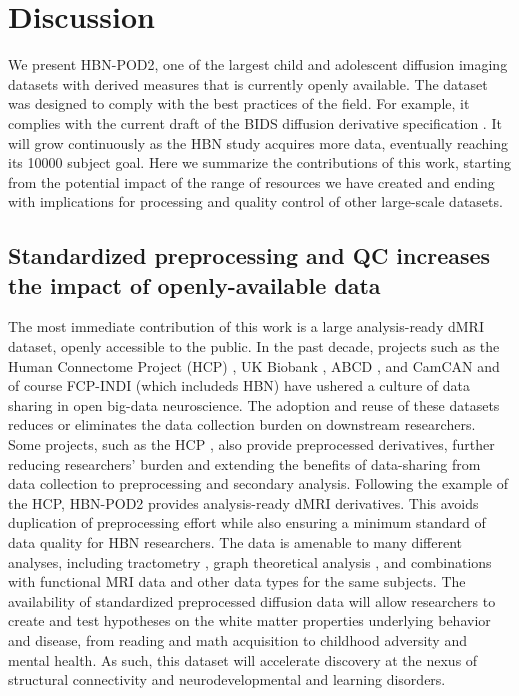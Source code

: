 \documentclass[fleqn,10pt]{wlscirep}
\begin{document}
\section*{Discussion}

We present HBN-POD2, one of the largest child and adolescent diffusion imaging
datasets with derived measures that is currently openly available. The dataset
was designed to comply with the best practices of the field. For example, it
complies with the current draft of the BIDS diffusion derivative specification
\cite{Pestilli2021}. It will grow continuously as the HBN study acquires more
data, eventually reaching its \num{10000} subject goal. Here we summarize the
contributions of this work, starting from the potential impact of the range of
resources we have created and ending with implications for processing and
quality control of other large-scale datasets.

\subsection*{Standardized preprocessing and QC increases the impact of openly-available data}

The most immediate contribution of this work is a large analysis-ready dMRI
dataset, openly accessible to the public. In the past decade, projects such as
the Human Connectome Project (HCP) \cite{van-essen2013-oi}, UK Biobank
\cite{miller2016-mq}, ABCD \cite{jernigan2018-my}, and CamCAN
\cite{taylor2017-or,shafto2014-ld} and of course FCP-INDI (which includeds HBN)
\cite{Mennes2013-eu} have ushered a culture of data sharing in open big-data
neuroscience. The adoption and reuse of these datasets reduces or eliminates the
data collection burden on downstream researchers. Some projects, such as the HCP
\cite{glasser2013-lo}, also provide preprocessed derivatives, further reducing
researchers' burden and extending the benefits of data-sharing from data
collection to preprocessing and secondary analysis. Following the example of the
HCP, HBN-POD2 provides analysis-ready dMRI derivatives. This avoids duplication
of preprocessing effort while also ensuring a minimum standard of data quality
for HBN researchers. The data is amenable to many different analyses, including
tractometry \cite{yeatman2012-rc}, graph theoretical analysis \cite{yeh2020-nu},
and combinations with functional MRI data and other data types for the same
subjects. The availability of standardized preprocessed diffusion data will
allow researchers to create and test hypotheses on the white matter properties
underlying behavior and disease, from reading and math acquisition to childhood
adversity and mental health. As such, this dataset will accelerate discovery at
the nexus of structural connectivity and neurodevelopmental and learning
disorders.
\end{document}
